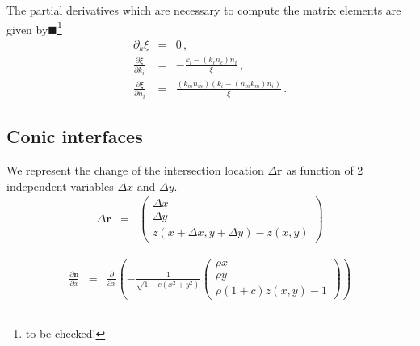 \documentclass[12pt,a4paper,twoside,openright,BCOR10mm,headsepline,titlepage,abstracton,chapterprefix,final]{scrreprt}
\newcommand\Vector[1]{{\mathbf{#1}}}
\newcommand{\remark}[1]{{\color{red}$\blacksquare$}\footnote{{\color{red}#1}}}
\begin{document}
The partial derivatives which are necessary to compute the matrix elements are given by\remark{to be checked!}
\begin{eqnarray}
 \partial_k \xi &=& 0\,,\\
 \frac{\partial \xi}{\partial k_i} &=& -\frac{k_i - (k_\ell n_\ell) n_i}{\xi}\,,\\
 \frac{\partial \xi}{\partial n_i} &=& \frac{(k_m n_m) (k_i - (n_m k_m) n_i)}{\xi}\,.
\end{eqnarray}


\subsection{Conic interfaces}

We represent the change of the intersection location $\Delta\Vector{r}$ as function of 2 independent variables $\Delta x$ and $\Delta y$.
\begin{eqnarray}
 \Delta\Vector{r} &=&
 \begin{pmatrix}
  \Delta x \\ \Delta y \\ z(x+\Delta x,y+\Delta y) - z(x,y)
 \end{pmatrix}
\end{eqnarray}

\begin{eqnarray}
 \frac{\partial \Vector{n}}{\partial x} &=& \frac{\partial}{\partial x} \left(
- \frac{1}{\sqrt{ 1 - c (x^2 + y^2)}} 
  \begin{pmatrix}
   \rho x \\
   \rho y \\
   \rho ( 1 + c ) z(x,y) - 1
  \end{pmatrix}
 \right)
\end{eqnarray}
\end{document}
